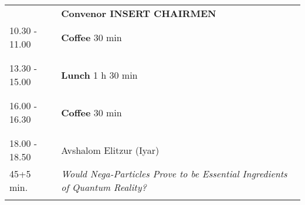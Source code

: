 \begin{longtable}{p{3cm}p{13cm}}
&\hfill {\bf Convenor INSERT CHAIRMEN }\\ 
10.30 - 11.00 & {\bf Coffee} \hfill 30 min \\ 
 & \\ 
 & \\ 
13.30 - 15.00 & {\bf Lunch} \hfill 1 h 30 min \\ 
 & \\ 
 & \\ 
16.00 - 16.30 & {\bf Coffee} \hfill 30 min \\ 
 & \\ 
 & \\ 
18.00 - 18.50 & Avshalom Elitzur (Iyar)\\ 
45+5 min. & {\it Would Nega-Particles Prove to be Essential Ingredients of Quantum Reality?}\\ 
 & \\ 
\end{longtable}

